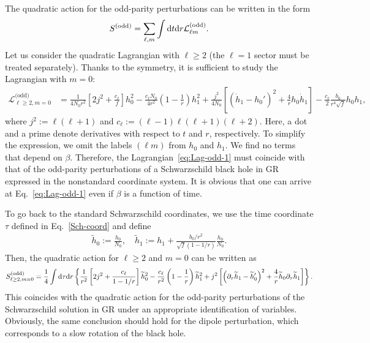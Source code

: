 \documentclass[aps,prd,preprintnumbers,superscriptaddress,nofootinbib,notitlepage]{revtex4-2}
\newcommand*{\D}{{\rm d}}
\begin{document}
The quadratic action for the odd-parity perturbations can be written in the form
\begin{align}
    S^{\textrm{(odd)}}=\sum_{\ell,m}\int\D t\D r\mathcal{L}_{\ell m}^{\textrm{(odd)}}.
\end{align}
Let us consider the quadratic Lagrangian with $\ell\ge 2$
(the $\ell=1$ sector must be treated separately).
Thanks to the symmetry, it is sufficient to study the Lagrangian with $m=0$:
\begin{align}
    \mathcal{L}_{\ell\ge2,m=0}^{\textrm{(odd)}}&=
    \frac{1}{4N_0r^2}\left[2j^2+\frac{c_\ell}{f}\right]h_0^2
    -\frac{c_\ell N_0}{4r^2}\left(1-\frac{1}{r}\right)h_1^2
    +\frac{j^2}{4N_0}\left[
    \left(\dot h_1-h_0'\right)^2+\frac{4}{r}h_0\dot h_1
    \right]-\frac{c_\ell}{2}\frac{b_0}{r^4\sqrt{f}}h_0h_1,\label{eq:Lag-odd-1}
\end{align}
where $j^2:=\ell(\ell+1)$ and $c_{\ell}:=(\ell-1)\ell(\ell+1)(\ell+2)$.
Here, a dot and a prime denote derivatives with respect to $t$ and $r$, respectively.
To simplify the expression, we omit the labels $(\ell m)$ from $h_0$ and $h_1$.
We find no terms that depend on $\beta$.
Therefore, the Lagrangian~\eqref{eq:Lag-odd-1} must coincide with that of
the odd-parity perturbations of a Schwarzschild black hole in GR
expressed in the nonstandard coordinate system.
It is obvious that one can arrive at Eq.~\eqref{eq:Lag-odd-1} even if $\beta$ is
a function of time.


To go back to the standard Schwarzschild coordinates,
we use the time coordinate $\tau$ defined in Eq.~\eqref{Sch-coord}
and define
\begin{align}
    \widetilde{h}_0:=\frac{h_0}{N_0},\quad 
    \widetilde{h}_1:=h_1+\frac{b_0/r^2}{\sqrt{f}(1-1/r)}\frac{h_0}{N_0}.
\end{align}
Then, the quadratic action for $\ell\ge 2$ and $m=0$ can be written as 
\begin{align}
    S^{(\textrm{odd})}_{\ell\ge 2,m=0}
    =\frac{1}{4} \int \D\tau \D r\left\{
    \frac{1}{r^2}\left[2j^2+\frac{c_\ell}{1-1/r}\right]\widetilde{h}_0^2
    -\frac{c_\ell}{r^2}\left(1-\frac{1}{r}\right)\widetilde{h}_1^2
    +j^2\left[
        \left(\partial_\tau\widetilde{h}_1-\widetilde{h}_0'\right)^2
        +\frac{4}{r}\widetilde{h}_0\partial_\tau \widetilde{h}_1
    \right]\right\}.
\end{align}
This coincides with the quadratic action for the odd-parity perturbations
of the Schwarzschild solution in GR under an appropriate identification of variables.
Obviously, the same conclusion should hold for the dipole perturbation,
which corresponds to a slow rotation of the black hole.
\end{document}
